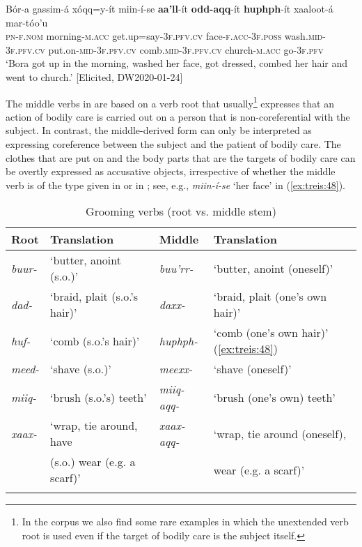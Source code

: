 \documentclass[output=paper]{langscibook}
\begin{document}
\ea\label{ex:treis:48} 
\gll Bór-a gassim-á xóqq=y-ít miin-í-se \textbf{aa’ll}-ít \textbf{odd-aqq}-ít \textbf{huphph}-ít xaaloot-á mar-tóo’u\\
     \textsc{pn-f.nom} morning-\textsc{m.acc} get.up=say-\textsc{3f.pfv.cv} face-\textsc{f.acc-3f.poss} wash.\textsc{mid-}3\textsc{f.pfv.cv} put.on-\textsc{mid-3f.pfv.cv} comb.\textsc{mid-3f.pfv.cv} church-\textsc{m.acc} go-3\textsc{f.pfv}\\
\glt ‘Bora got up in the morning, washed her face, got dressed, combed her hair and went to church.’ [Elicited, DW2020-01-24]\z

The middle verbs in  are based on a verb root that usually\footnote{In the corpus we also find some rare examples in which the unextended verb root is used even if the target of bodily care is the subject itself.} expresses that an action of bodily care is carried out on a person that is non-coreferential with the subject. In contrast, the middle-derived form can only be interpreted as expressing coreference between the subject and the patient of bodily care. The clothes that are put on and the body parts that are the targets of bodily care can be overtly expressed as accusative objects, irrespective of whether the middle verb is of the type given in  or in ; see, e.g., \textit{miin-í-se} ‘her face’ in (\ref{ex:treis:48}).

\begin{table}
\caption{Grooming verbs (root vs. middle stem)}
\label{tab:treis:5}
\begin{tabularx}{\textwidth}{lllX}
\lsptoprule
Root & Translation & Middle & Translation\\
\hline
\textit{buur-} & ‘butter, anoint (s.o.)’ & \textit{buu’rr-} & ‘butter, anoint (oneself)’\\
\textit{dad-} & ‘braid, plait (s.o.’s hair)’ & \textit{daxx-} & ‘braid, plait (one’s own hair)'\\
\textit{huf-} & ‘comb (s.o.’s hair)’ & \textit{huphph-} & ‘comb (one's own hair)’ (\ref{ex:treis:48})\\
\textit{meed-} & ‘shave (s.o.)’ & \textit{meexx-} & ‘shave (oneself)’\\
\textit{miiq-} & ‘brush (s.o.’s) teeth’ & \textit{miiq-aqq-} & ‘brush (one’s own) teeth’\\
\textit{xaax-} & ‘wrap, tie around, have & \textit{xaax-aqq-} & \textsc{‘}wrap, tie around (oneself),\\
& (s.o.) wear (e.g. a scarf)' & & wear (e.g. a scarf)’\\
\lspbottomrule
\end{tabularx}
\end{table}
\end{document}

